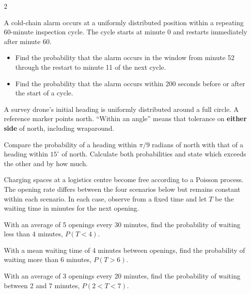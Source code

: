 \begin{multicols}{2}
\begin{minipage}{\linewidth}
A cold-chain alarm occurs at a uniformly distributed position within a repeating 60-minute inspection cycle. The cycle starts at minute 0 and restarts immediately after minute 60.

\begin{itemize}
	\item Find the probability that the alarm occurs in the window from minute 52 through the restart to minute 11 of the next cycle. 
	\item Find the probability that the alarm occurs within 200 seconds before or after the start of a cycle. 
\end{itemize}

\end{minipage}\par
\begin{minipage}{\linewidth}
A survey drone's initial heading is uniformly distributed around a full circle. A reference marker points north. ``Within an angle'' means that tolerance on \textbf{either side} of north, including wraparound.

Compare the probability of a heading within $\pi/9$ radians of north with that of a heading within $15^\circ$ of north. Calculate both probabilities and state which exceeds the other and by how much. 

\end{minipage}\par
\begin{minipage}{\linewidth}
Charging spaces at a logistics centre become free according to a Poisson process. The opening rate differs between the four scenarios below but remains constant within each scenario. In each case, observe from a fixed time and let $T$ be the waiting time in minutes for the next opening.

With an average of 5 openings every 30 minutes, find the probability of waiting less than 4 minutes, $P(T<4)$. 

With a mean waiting time of 4 minutes between openings, find the probability of waiting more than 6 minutes, $P(T>6)$. 

With an average of 3 openings every 20 minutes, find the probability of waiting between 2 and 7 minutes, $P(2<T<7)$. 


\end{minipage}
\end{multicols}
